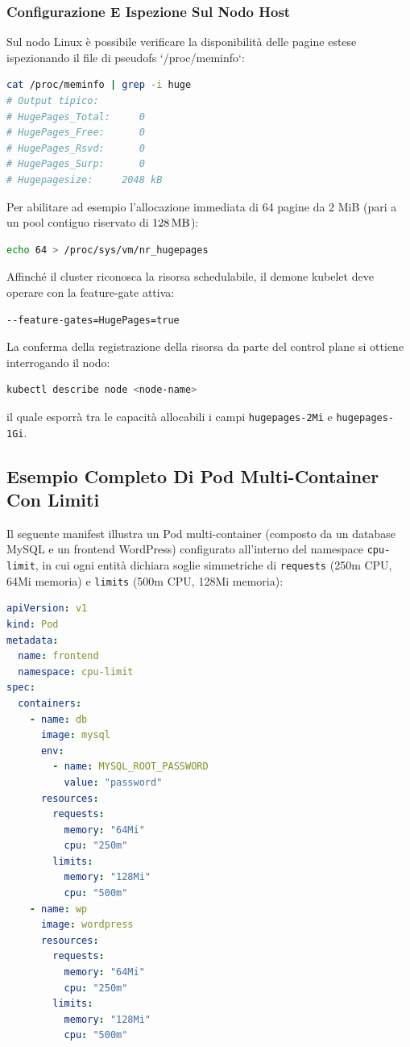 \documentclass[11pt, a4paper]{article}
\begin{document}
\subsubsection{Configurazione E Ispezione Sul Nodo Host}
Sul nodo Linux è possibile verificare la disponibilità delle pagine estese ispezionando il file di pseudofs `/proc/meminfo`:
\begin{lstlisting}[language=bash]
cat /proc/meminfo | grep -i huge
# Output tipico:
# HugePages_Total:     0
# HugePages_Free:      0
# HugePages_Rsvd:      0
# HugePages_Surp:      0
# Hugepagesize:     2048 kB
\end{lstlisting}

Per abilitare ad esempio l'allocazione immediata di 64 pagine da 2 MiB (pari a un pool contiguo riservato di $\SI{128}{\mega\byte}$):
\begin{lstlisting}[language=bash]
echo 64 > /proc/sys/vm/nr_hugepages
\end{lstlisting}

Affinché il cluster riconosca la risorsa schedulabile, il demone kubelet deve operare con la feature-gate attiva:
\begin{lstlisting}[language=bash]
--feature-gates=HugePages=true
\end{lstlisting}
La conferma della registrazione della risorsa da parte del control plane si ottiene interrogando il nodo:
\begin{lstlisting}[language=bash]
kubectl describe node <node-name>
\end{lstlisting}
il quale esporrà tra le capacità allocabili i campi \texttt{hugepages-2Mi} e \texttt{hugepages-1Gi}.

\subsection{Esempio Completo Di Pod Multi-Container Con Limiti}

Il seguente manifest illustra un Pod multi-container (composto da un database MySQL e un frontend WordPress) configurato all'interno del namespace \texttt{cpu-limit}, in cui ogni entità dichiara soglie simmetriche di \texttt{requests} (250m CPU, 64Mi memoria) e \texttt{limits} (500m CPU, 128Mi memoria):

\begin{lstlisting}[language=yaml]
apiVersion: v1
kind: Pod
metadata:
  name: frontend
  namespace: cpu-limit
spec:
  containers:
    - name: db
      image: mysql
      env:
        - name: MYSQL_ROOT_PASSWORD
          value: "password"
      resources:
        requests:
          memory: "64Mi"
          cpu: "250m"
        limits:
          memory: "128Mi"
          cpu: "500m"
    - name: wp
      image: wordpress
      resources:
        requests:
          memory: "64Mi"
          cpu: "250m"
        limits:
          memory: "128Mi"
          cpu: "500m"
\end{lstlisting}
\end{document}
